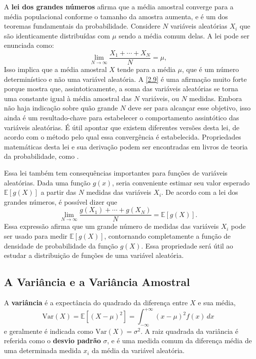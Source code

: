 A \textbf{lei dos grandes números} afirma que a média amostral converge para a média populacional conforme o tamanho da amostra aumenta, e é um dos teoremas fundamentais da probabilidade. Considere $N$ variáveis aleatórias $X_i$ que são identicamente distribuídas com $\mu$ sendo a média comum delas. A lei pode ser enunciada como:
\begin{equation}\label{2.9}
\lim\limits_{N \to \infty} \dfrac{X_1 + \cdots + X_N}{N} = \mu,
\end{equation}
Isso implica que a média amostral $X$ tende para a média $\mu$, que é um número determinístico e não uma variável aleatória. A \autoref{2.9} é uma afirmação muito forte porque mostra que, assintoticamente, a soma das variáveis aleatórias se torna uma constante igual à média amostral das $N$ variáveis, ou $N$ medidas. Embora não haja indicação sobre quão grande $N$ deve ser para alcançar esse objetivo, isso ainda é um resultado-chave para estabelecer o comportamento assintótico das variáveis aleatórias. É útil apontar que existem diferentes versões desta lei, de acordo com o método pelo qual essa convergência é estabelecida. Propriedades matemáticas desta lei e sua derivação podem ser encontradas em livros de teoria da probabilidade, como \citet{kolmogorov1950foundations,ross2019introduction}.

Essa lei também tem consequências importantes para funções de variáveis aleatórias. Dada uma função $g(x)$, seria conveniente estimar seu valor esperado $\mathbb{E}[g(X)]$ a partir das $N$ medidas das variáveis $X_i$. De acordo com a lei dos grandes números, é possível dizer que
\begin{equation}
	\lim\limits_{N \to \infty} \dfrac{g(X_1) + \cdots + g(X_N)}{N} = \mathbb{E}[g(X)].
\end{equation}
Essa expressão afirma que um grande número de medidas das variáveis $X_i$ pode ser usado para medir $\mathbb{E}[g(X)]$, contornando completamente a função de densidade de probabilidade da função $g(X)$. Essa propriedade será útil ao estudar a distribuição de funções de uma variável aleatória.

\subsection{A Variância e a Variância Amostral}

A \textbf{variância} é a expectância do quadrado da diferença entre $X$ e sua média,
\begin{equation}
\text{Var}(X) = \mathbb{E}[(X - \mu)^2] = \int_{-\infty}^{+\infty} (x - \mu)^2 f(x)\,dx
\end{equation}
e geralmente é indicada como $\text{Var}(X) = \sigma^2$. A raiz quadrada da variância é referida como o \textbf{desvio padrão} $\sigma$, e é uma medida comum da diferença média de uma determinada medida $x_i$ da média da variável aleatória.

